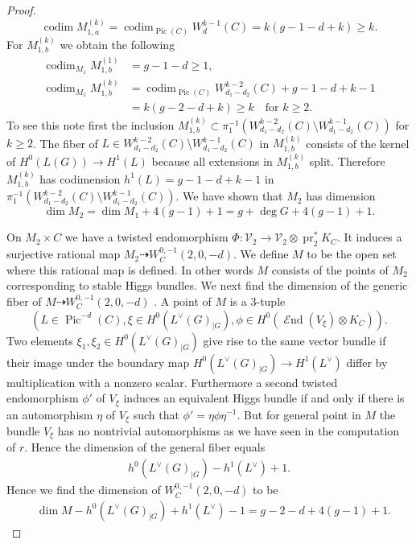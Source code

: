 \documentclass[12pt]{extarticle}
\theoremstyle{definition}
\numberwithin{theorem}{section}
\newcommand{\cV}{\mathcal{V}}
\newcommand{\op}{\operatorname}
\DeclareMathOperator{\End}{\mathcal{E}nd}
\begin{document}
\begin{proof}
\begin{equation*}
\op{codim}M_{1,a}^{(k)} = \op{codim}_{\op{Pic}(C)}W^{k-1}_{d}(C) = k(g-1 -d +k) \geq k.
\end{equation*}
For $M_{1,b}^{(k)}$ we obtain the following  
\begin{align*}\label{eq:dim_jump_loci}
\op{codim}_{M_1} M_{1,b}^{(1)} &= g -1 -d\geq 1,\\
\op{codim}_{M_1} M^{(k)}_{1,b} &= \op{codim}_{\op{Pic}(C)}W^{k-2}_{d_1-d_2}(C) + g-1 -d + k -1 \\
&= k(g-2 -d + k)\geq k \quad\text{for $k\geq 2$}.
\end{align*}
To see this note first the inclusion $M^{(k)}_{1,b} \subset \pi_1^{-1}\left(W^{k-2}_{d_1-d_2}(C)\setminus W^{k-1}_{d_1-d_2}(C)\right)$ for $k\geq 2$.
The fiber of  $L \in W^{k-2}_{d_1-d_2}(C)\setminus W^{k-1}_{d_1-d_2}(C)$ in $M^{(k)}_{1,b}$ consists of the kernel of $H^0(L(G)) \to H^1(L)$ because all extensions in $M^{(k)}_{1,b}$ split. Therefore $M^{(k)}_{1,b}$ has codimension $h^1(L) = g-1 -d + k -1 $ in $\pi_1^{-1}\left(W^{k-2}_{d_1-d_2}(C)\setminus W^{k-1}_{d_1-d_2}(C)\right)$. We have shown that $M_2$ has dimension 
\begin{equation}
\dim M_2 = \dim M_1 + 4(g-1) +1 = g + \deg G+ 4(g-1) +1.
\end{equation}

On $M_2\times C$ we have a twisted endomorphism $\Phi: \cV_2 \to \cV_2 \otimes \op{pr}_2^*K_C$. It induces a surjective rational map $M_2 \dashrightarrow W_C^{0,-1}(2,0,-d)$. We define $M$ to be the open set where this rational map is defined. In other words $M$ consists of the points of $M_2$ corresponding to stable Higgs bundles. 
 We next find the dimension of the generic fiber of $M \dashrightarrow W_C^{0,-1}(2,0,-d)$ . A point of $M$ is a $3$-tuple 
\begin{equation}
(L\in \op{Pic}^{-d}(C),\xi \in H^0(L^\vee(G)_{|G}),\phi \in H^0(\End(V_\xi)\otimes K_C)).
\end{equation}
Two elements $\xi_1,\xi_2 \in H^0(L^\vee(G)_{|G})$ give rise to the same vector bundle if their image under the boundary map $H^0(L^\vee(G)_{|G}) \to H^1(L^\vee)$ differ by multiplication with a nonzero scalar. Furthermore a second twisted endomorphism $\phi'$ of $V_\xi$ induces an equivalent Higgs bundle if and only if there is an automorphism $\eta$ of $V_\xi$ such that $\phi' = \eta\phi \eta^{-1}$. But for general point in $M$ the bundle $V_\xi$ has no nontrivial automorphisms as we have seen in the computation of $r$. Hence the dimension of the general fiber equals 
\begin{align}\label{eq:redundancy}
h^0(L^\vee(G)_{|G})-h^1(L^\vee) + 1.
\end{align}
Hence we find the dimension of $W^{0,-1}_C(2,0,-d)$ to be
\begin{align*}
&\dim M - h^0(L^\vee(G)_{|G})+h^1(L^\vee) - 1 = g-2 - d + 4(g-1) + 1.
\end{align*}


\end{proof}
\end{document}
